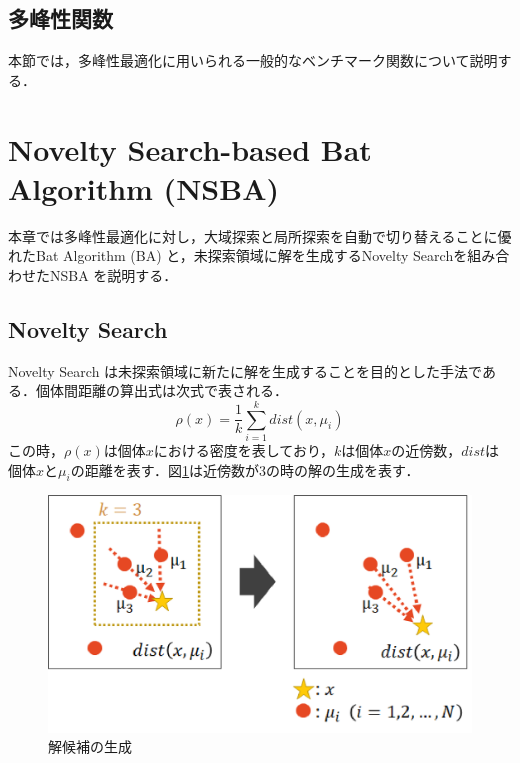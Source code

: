 \documentclass[a4j,11pt]{jarticle}
\def\proposed{DNRBA}
\begin{document}
\subsection{多峰性関数}
\label{ss:benchmark}
本節では，多峰性最適化に用いられる一般的なベンチマーク関数について説明する．

\clearpage
\newpage
\section{Novelty Search-based Bat Algorithm (NSBA)}
\label{sec:NSBA}
本章では多峰性最適化に対し，大域探索と局所探索を自動で切り替えることに優れたBat Algorithm (BA) と，未探索領域に解を生成するNovelty Searchを組み合わせたNSBA \cite{NSBA} を説明する．

\subsection{Novelty Search}
\label{ss:NS}
Novelty Search \cite{NS} は未探索領域に新たに解を生成することを目的とした手法である．個体間距離の算出式は次式で表される．
\begin{equation}
\label{eq:ns}
\rho(x)=\frac{1}{k}\sum_{i=1}^k dist(x,\mu_i)
\end{equation}
この時，$\rho(x)$は個体$x$における密度を表しており，$kは$個体$x$の近傍数，$dist$は個体$x$と$\mu_i$の距離を表す．図\ref{fig:ns}は近傍数が3の時の解の生成を表す．
\begin{figure}[h]
  \centering
  \includegraphics[width=0.8\linewidth]{eps/IES2018/ns.eps}
  \caption{解候補の生成}
  \label{fig:ns}
\end{figure}
\end{document}
